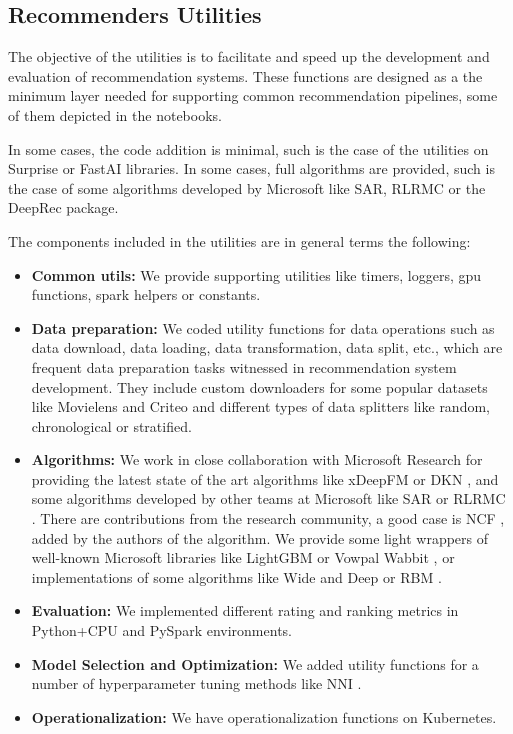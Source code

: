 \subsection{Recommenders Utilities}

The objective of the utilities is to facilitate and speed up the development and evaluation of recommendation systems.
These functions are designed as a the minimum layer needed for supporting common recommendation pipelines, some of 
them depicted in the notebooks. 

In some cases, the code addition is minimal, such is the case of the utilities on Surprise \cite{Surprise} or 
FastAI \cite{howard2018fastai} libraries. In some cases, full algorithms are provided, such is the case of 
some algorithms developed by Microsoft like SAR, RLRMC or the DeepRec package.

The components included in the utilities are in general terms the following: 
\begin{itemize}
    \item \textbf{Common utils:} We provide supporting utilities like timers, loggers, gpu functions, 
    spark helpers or constants.
    \item \textbf{Data preparation:} We coded utility functions for data operations 
    such as data download, data loading, data transformation, data split, etc., which are frequent data preparation 
    tasks witnessed in recommendation system development. They include custom downloaders for some
    popular datasets like Movielens and Criteo and different types of data splitters like random, chronological or
    stratified.     
    \item \textbf{Algorithms:} We work in close collaboration with Microsoft Research for providing the latest state of
    the art algorithms like xDeepFM \cite{lian2018xdeepfm} or DKN \cite{wang2018dkn}, and some algorithms developed by other
    teams at Microsoft like SAR \cite{diev2015sar} or RLRMC \cite{rlrmc}. There are contributions from the research community, a good case is NCF 
    \cite{he2017neural}, added by the authors of the algorithm. We provide some light wrappers of well-known Microsoft
    libraries like LightGBM \cite{ke2017lightgbm} or Vowpal Wabbit \cite{agarwal2014reliable}, or implementations
    of some algorithms like Wide and Deep \cite{cheng2016wide} or RBM \cite{salakhutdinov2007restricted}. 
    \item \textbf{Evaluation:} We implemented different rating and ranking metrics in Python+CPU and PySpark environments.
    \item \textbf{Model Selection and Optimization:} We added utility functions for a number of hyperparameter 
    tuning methods like NNI \cite{nni}. 
    \item \textbf{Operationalization:} We have operationalization functions on Kubernetes.
\end{itemize}
    

